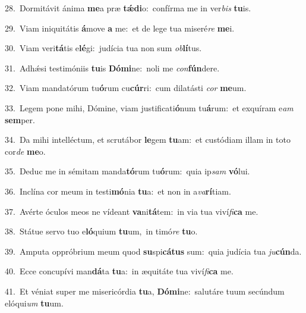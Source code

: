 {\numbfont\textcolor{\numbcolor}{28.}}~Dormitávit ánima \textbf{me}\-a præ \textbf{tǽ}\-\textbf{di}o:~\star confírma me in ver\textit{bis} \textbf{tu}\-is.\par
{\numbfont\textcolor{\numbcolor}{29.}}~Viam iniquitátis \textbf{á}\-move \textbf{a} me:~\star et de lege tua miseré\textit{re} \textbf{me}\-i.\par
{\numbfont\textcolor{\numbcolor}{30.}}~Viam veri\-\textbf{tá}\-tis e\-\textbf{lé}\-gi:~\star judícia tua non sum \textit{ob}\-\textbf{lí}tus.\par
{\numbfont\textcolor{\numbcolor}{31.}}~Adhǽsi testimóniis \textbf{tu}\-is \textbf{Dó}\-\textbf{mi}ne:~\star noli me \textit{con}\-\textbf{fún}dere.\par
{\numbfont\textcolor{\numbcolor}{32.}}~Viam mandatórum tu\-\textbf{ó}\-rum cu\-\textbf{cúr}\-ri:~\star cum dilatásti \textit{cor} \textbf{me}\-um.\par
{\numbfont\textcolor{\numbcolor}{33.}}~Legem pone mihi, Dómine, viam justificati\-\textbf{ó}\-num tu\-\textbf{á}\-rum:~\star et exquíram e\textit{am} \textbf{sem}\-per.\par
{\numbfont\textcolor{\numbcolor}{34.}}~Da mihi intelléctum, et scrutábor \textbf{le}\-gem \textbf{tu}\-am:~\star et custódiam illam in toto cor\textit{de} \textbf{me}\-o.\par
{\numbfont\textcolor{\numbcolor}{35.}}~Deduc me in sémitam manda\-\textbf{tó}\-rum tu\-\textbf{ó}\-rum:~\star quia ip\textit{sam} \textbf{vó}\-lui.\par
{\numbfont\textcolor{\numbcolor}{36.}}~Inclína cor meum in testi\-\textbf{mó}\-nia \textbf{tu}\-a:~\star et non in a\-\textit{va}\-\textbf{rí}tiam.\par
{\numbfont\textcolor{\numbcolor}{37.}}~Avérte óculos meos ne vídeant \textbf{va}\-ni\-\textbf{tá}\-tem:~\star in via tua viví\-\textit{fi}\-\textbf{ca} me.\par
{\numbfont\textcolor{\numbcolor}{38.}}~Státue servo tuo e\-\textbf{ló}\-quium \textbf{tu}\-um,~\star in timó\textit{re} \textbf{tu}\-o.\par
{\numbfont\textcolor{\numbcolor}{39.}}~Amputa oppróbrium meum quod \textbf{su}\-spi\-\textbf{cá}\-\textbf{tus} sum:~\star quia judícia tua \textit{ju}\-\textbf{cún}da.\par
{\numbfont\textcolor{\numbcolor}{40.}}~Ecce concupívi man\-\textbf{dá}\-ta \textbf{tu}\-a:~\star in æquitáte tua viví\-\textit{fi}\-\textbf{ca} me.\par
{\numbfont\textcolor{\numbcolor}{41.}}~Et véniat super me misericórdia \textbf{tu}\-a, \textbf{Dó}\-\textbf{mi}ne:~\star salutáre tuum secúndum elóqui\textit{um} \textbf{tu}\-um.\par
